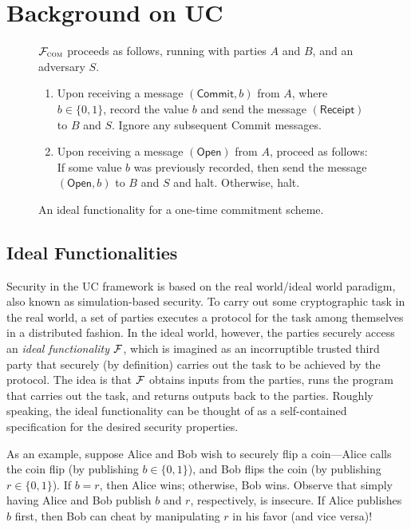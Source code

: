\section{Background on UC}
\label{sec:background}

\begin{figure}
\begin{func}
    $\mathcal{{F}}_{\textsc{com}}$ proceeds as follows, running with parties $A$ and
  $B$, and an adversary $S$.
    \begin{enumerate}
        \item Upon receiving a message $(\mathsf{Commit}, b)$ from $A$, where $b
          \in \{ 0, 1 \}$, record the value $b$ and send the message
          $(\mathsf{Receipt})$ to $B$ and $S$. Ignore any subsequent
          \textsf{Commit} messages.
        \item Upon receiving a message $(\mathsf{Open})$ from $A$, proceed as
          follows: If some value $b$ was previously recorded, then send the
          message $(\mathsf{Open}, b)$ to $B$ and $S$ and halt. Otherwise, halt.
    \end{enumerate}
\end{func}
\caption{An ideal functionality for a one-time commitment scheme.}
\label{func:com}
\end{figure}

\subsection{Ideal Functionalities}
\label{subsec:functionalities}

Security in the UC framework is based on the real world/ideal world paradigm,
also known as simulation-based security. To carry out some cryptographic task in
the real world, a set of parties executes a protocol for the task among
themselves in a distributed fashion. In the ideal world, however, the parties
securely access an \emph{ideal functionality} $\mathcal{{F}}$, which is imagined as an
incorruptible trusted third party that securely (by definition) carries out the
task to be achieved by the protocol. The idea is that $\mathcal{{F}}$ obtains inputs
from the parties, runs the program that carries out the task, and returns
outputs back to the parties. Roughly speaking, the ideal functionality can be
thought of as a self-contained specification for the desired security
properties.

As an example, suppose Alice and Bob wish to securely flip a coin---Alice calls
the coin flip (by publishing $b \in \{ 0, 1\}$), and Bob flips the coin (by
publishing $r \in \{0, 1\}$). If $b = r$, then Alice wins; otherwise, Bob
wins. Observe that simply having Alice and Bob publish $b$ and $r$,
respectively, is insecure. If Alice publishes $b$ first, then Bob can cheat by
manipulating $r$ in his favor (and vice versa)!

